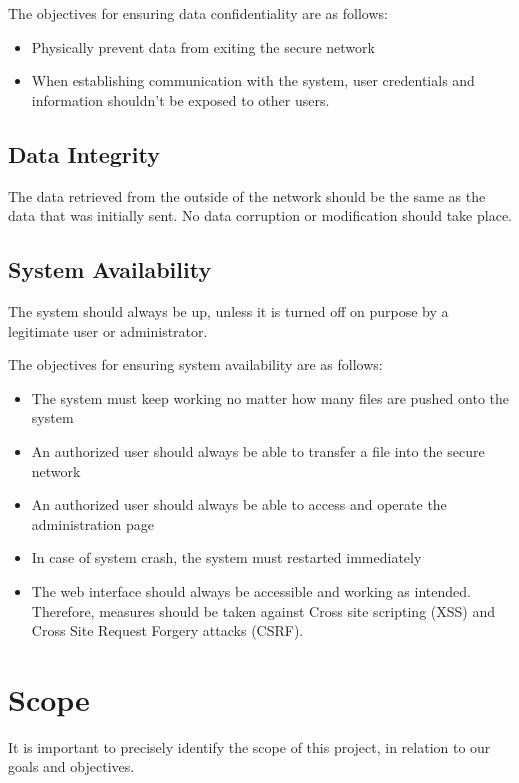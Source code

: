 \documentclass[a4paper,11pt]{article}
\begin{document}
The objectives for ensuring data confidentiality are as follows:

\begin{itemize}
\item{Physically prevent data from exiting the secure network}
\item{When establishing communication with the system, user credentials and information shouldn't be exposed to other users.}
\end{itemize}

\subsection{Data Integrity}
The data retrieved from the outside of the network should be the same as the data that was initially sent. No data corruption or modification should take place.

\subsection{System Availability}
The system should always be up, unless it is turned off on purpose by a legitimate user or administrator.

The objectives for ensuring system availability are as follows:

\begin{itemize}
\item{The system must keep working no matter how many files are pushed onto the system}
\item{An authorized user should always be able to transfer a file into the secure network}
\item{An authorized user should always be able to access and operate the administration page}
\item{In case of system crash, the system must restarted immediately}
\item{The web interface should always be accessible and working as intended. Therefore, measures should be taken against Cross site scripting (XSS) and Cross Site Request Forgery attacks (CSRF).}

\end{itemize}


\section{Scope}
It is important to precisely identify the scope of this project, in relation to our goals and objectives.\\
\end{document}
